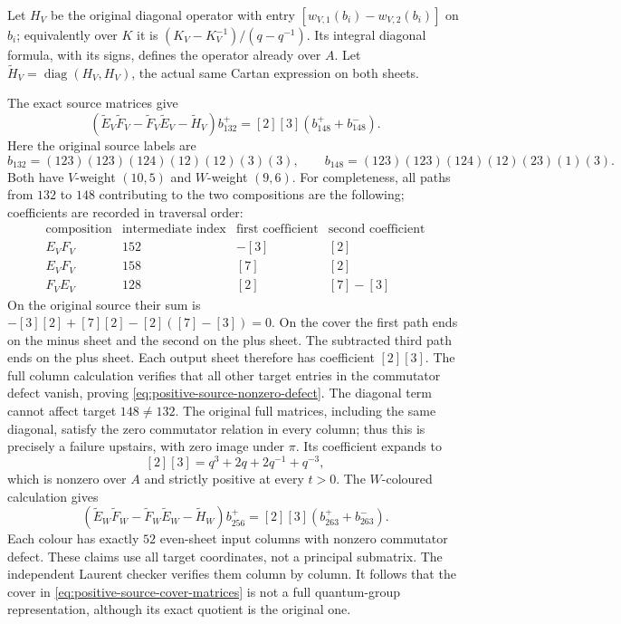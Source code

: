Let $H_V$ be the original diagonal operator with entry
$[w_{V,1}(b_i)-w_{V,2}(b_i)]$ on $b_i$; equivalently over $K$ it is
$(K_V-K_V^{-1})/(q-q^{-1})$. Its integral diagonal formula, with its
signs, defines the operator already over $A$. Let
$\widetilde H_V=\operatorname{diag}(H_V,H_V)$, the actual same
Cartan expression on both sheets.

The exact source matrices give
\begin{equation}\label{eq:positive-source-nonzero-defect}
 (\widetilde E_V\widetilde F_V-
   \widetilde F_V\widetilde E_V-\widetilde H_V)b_{132}^+
       =[2][3](b_{148}^++b_{148}^-).
\end{equation}
Here the original source labels are
\[
 b_{132}=(123)(123)(124)(12)(12)(3)(3),\qquad
 b_{148}=(123)(123)(124)(12)(23)(1)(3).
\]
Both have $V$-weight $(10,5)$ and $W$-weight $(9,6)$.
For completeness, all paths from $132$ to $148$ contributing to
the two compositions are the following; coefficients are recorded
in traversal order:
\[
\begin{array}{c|r|c|c}
\text{composition}&\text{intermediate index}&\text{first coefficient}
                                         &\text{second coefficient}\\\hline
 E_VF_V&152&-[3]&[2]\\
 E_VF_V&158&[7]&[2]\\
 F_VE_V&128&[2]&[7]-[3]
\end{array}
\]
On the original source their sum is
$-[3][2]+[7][2]-[2]([7]-[3])=0$.
On the cover the first path ends on the minus sheet and the second
on the plus sheet. The subtracted third path ends on the plus sheet.
Each output sheet therefore has coefficient $[2][3]$. The full
column calculation verifies that all other target entries in the
commutator defect vanish, proving
\eqref{eq:positive-source-nonzero-defect}. The diagonal term cannot
affect target $148\ne132$. The original full matrices, including
the same diagonal, satisfy the zero commutator relation in every
column; thus this is precisely a failure upstairs, with zero image
under $\pi$. Its coefficient expands to
\[
 [2][3]=q^3+2q+2q^{-1}+q^{-3},
\]
which is nonzero over $A$ and strictly positive at every $t>0$.
The $W$-coloured calculation gives
\[
 (\widetilde E_W\widetilde F_W-
   \widetilde F_W\widetilde E_W-\widetilde H_W)b_{256}^+
       =[2][3](b_{263}^++b_{263}^-).
\]
Each colour has exactly $52$ even-sheet input columns with nonzero
commutator defect. These claims use all target coordinates, not a
principal submatrix. The independent Laurent checker verifies them
column by column. It follows that the cover in
\eqref{eq:positive-source-cover-matrices} is not a full quantum-group
representation, although its exact quotient is the original one.

